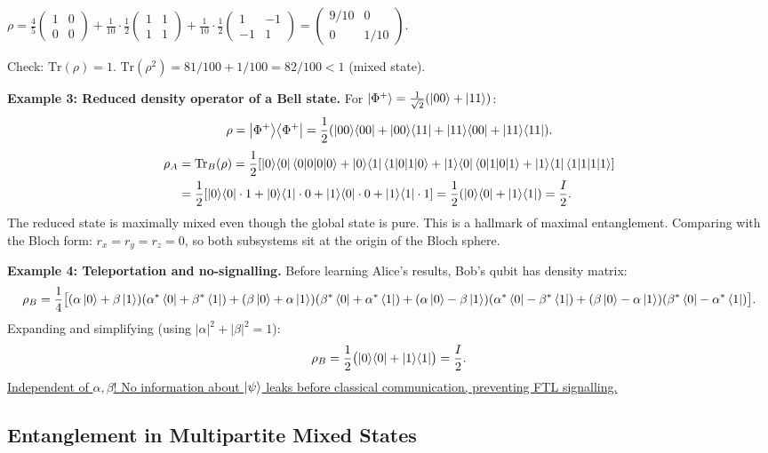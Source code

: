 \documentclass[10pt,a4paper]{article}
\begin{document}
$\rho=\frac{4}{5}\begin{pmatrix}1&0\\0&0\end{pmatrix}+\frac{1}{10}\cdot\frac{1}{2}\begin{pmatrix}1&1\\1&1\end{pmatrix}+\frac{1}{10}\cdot\frac{1}{2}\begin{pmatrix}1&-1\\-1&1\end{pmatrix}=\begin{pmatrix}9/10&0\\0&1/10\end{pmatrix}$.

Check: $\mathrm{Tr}(\rho)=1$. $\mathrm{Tr}(\rho^2)=81/100+1/100=82/100<1$ (mixed state).

\textbf{Example 3: Reduced density operator of a Bell state.}
For $\ket{\Phi^+}=\frac{1}{\sqrt{2}}(\ket{00}+\ket{11})$:
\[
\rho=\ket{\Phi^+}\!\bra{\Phi^+}=\frac{1}{2}(\ket{00}\!\bra{00}+\ket{00}\!\bra{11}+\ket{11}\!\bra{00}+\ket{11}\!\bra{11}).
\]
\begin{align*}
\rho_A&=\mathrm{Tr}_B(\rho)=\frac{1}{2}[\ket{0}\!\bra{0}\braket{0|0}+\ket{0}\!\bra{1}\braket{1|0}+\ket{1}\!\bra{0}\braket{0|1}+\ket{1}\!\bra{1}\braket{1|1}]\\
&=\frac{1}{2}[\ket{0}\!\bra{0}\cdot 1+\ket{0}\!\bra{1}\cdot 0+\ket{1}\!\bra{0}\cdot 0+\ket{1}\!\bra{1}\cdot 1]=\frac{1}{2}(\ket{0}\!\bra{0}+\ket{1}\!\bra{1})=\frac{I}{2}.
\end{align*}
The reduced state is maximally mixed even though the global state is pure. This is a hallmark of maximal entanglement. Comparing with the Bloch form: $r_x=r_y=r_z=0$, so both subsystems sit at the origin of the Bloch sphere.

\textbf{Example 4: Teleportation and no-signalling.}
Before learning Alice's results, Bob's qubit has density matrix:
\[
\rho_B=\frac{1}{4}\bigl[(\alpha\ket{0}+\beta\ket{1})(\alpha^*\bra{0}+\beta^*\bra{1})+(\beta\ket{0}+\alpha\ket{1})(\beta^*\bra{0}+\alpha^*\bra{1})+(\alpha\ket{0}-\beta\ket{1})(\alpha^*\bra{0}-\beta^*\bra{1})+(\beta\ket{0}-\alpha\ket{1})(\beta^*\bra{0}-\alpha^*\bra{1})\bigr].
\]
Expanding and simplifying (using $|\alpha|^2+|\beta|^2=1$):
\[
\rho_B=\frac{1}{2}\bigl(\ket{0}\!\bra{0}+\ket{1}\!\bra{1}\bigr)=\frac{I}{2}.
\]
\uline{Independent of $\alpha,\beta$! No information about $\ket{\psi}$ leaks before classical communication, preventing FTL signalling.}

\subsection{Entanglement in Multipartite Mixed States}
\end{document}
